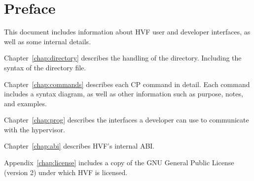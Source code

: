 \chapter*{Preface}
This document includes information about HVF user and developer interfaces,
as well as some internal details.

Chapter~\ref{chap:directory} describes the handling of the directory.
Including the syntax of the directory file.

Chapter~\ref{chap:commands} describes each CP command in detail.  Each
command includes a syntax diagram, as well as other information such as
purpose, notes, and examples.

Chapter~\ref{chap:prog} describes the interfaces a developer can use to
communicate with the hypervisor.


Chapter~\ref{chap:abi} describes HVF's internal ABI.

Appendix~\ref{chap:license} includes a copy of the GNU General Public
License (version 2) under which HVF is licensed.

